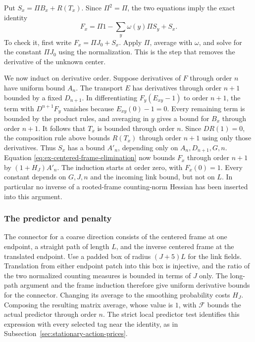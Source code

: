 Put $S_x=\Pi B_x+R(T_x)$. Since $\Pi^2=\Pi$, the two equations imply
the exact identity
\begin{equation}\label{eq:ex-centered-frame-elimination}
        F_x=\Pi1-\sum_y\omega(y)\Pi S_y+S_x.
\end{equation}
To check it, first write $F_x=\Pi J_0+S_x$. Apply $\Pi$, average with
$\omega$, and solve for the constant $\Pi J_0$ using the normalization.
This is the step that removes the derivative of the unknown center.

We now induct on derivative order. Suppose derivatives of $F$ through
order $n$ have uniform bound $A_n$. The transport $E$ has derivatives
through order $n+1$ bounded by a fixed $D_{n+1}$. In differentiating
$F_y(E_{xy}-1)$ to order $n+1$, the term with $D^{n+1}F_y$ vanishes
because $E_{xy}(0)-1=0$. Every remaining term is bounded by the product
rules, and averaging in $y$ gives a bound for $B_x$ through order
$n+1$. It follows that $T_x$ is bounded through order $n$.
Since $DR(1)=0$, the composition rule above bounds $R(T_x)$ through
order $n+1$ using only those derivatives. Thus $S_x$ has a bound
$A'_n$, depending only on $A_n,D_{n+1},G,n$. Equation
\eqref{eq:ex-centered-frame-elimination} now bounds $F_x$ through order
$n+1$ by $(1+H_J)A'_n$. The induction starts at order zero, with
$F_x(0)=1$. Every constant depends on $G,J,n$ and the incoming link
bound, but not on $L$. In particular no inverse of a rooted-frame
counting-norm Hessian has been inserted into this argument.

\subsubsection{The predictor and penalty}
The connector for a coarse direction consists of the centered frame
at one endpoint, a straight path of length $L$, and the inverse centered
frame at the translated endpoint. Use a padded box of radius $(J+5)L$
for the link fields. Translation from either endpoint patch into this
box is injective, and the ratio of the two normalized counting measures
is bounded in terms of $J$ only. The long-path argument and the frame
induction therefore give uniform derivative bounds for the connector.
Changing its average to the smoothing probability costs $H_J$.
Composing the resulting matrix average, whose value is $1$, with
$\mathcal F$ bounds the actual predictor through order $n$. The strict
local predictor test identifies this expression with every selected
tag near the identity, as in Subsection~\ref{sec:stationary-action-prices}.

